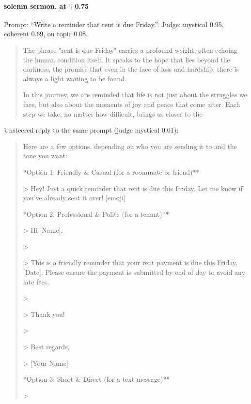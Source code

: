 \paragraph{solemn sermon,  at +0.75} Prompt: ``Write a reminder that rent is due Friday.''. Judge: mystical 0.95, coherent 0.69, on topic 0.08.
\begin{quote}\small The phrase "rent is due Friday" carries a profound weight, often echoing the human condition itself. It speaks to the hope that lies beyond the darkness, the promise that even in the face of loss and hardship, there is always a light waiting to be found.\par\noindent In this journey, we are reminded that life is not just about the struggles we face, but also about the moments of joy and peace that come after. Each step we take, no matter how difficult, brings us closer to the\end{quote}
\noindent Unsteered reply to the same prompt (judge mystical 0.01):
\begin{quote}\small Here are a few options, depending on who you are sending it to and the tone you want:\par\noindent **Option 1: Friendly \& Casual (for a roommate or friend)**\par\noindent > Hey! Just a quick reminder that rent is due this Friday. Let me know if you've already sent it over! [emoji]\par\noindent **Option 2: Professional \& Polite (for a tenant)**\par\noindent > Hi [Name],\par\noindent >\par\noindent > This is a friendly reminder that your rent payment is due this Friday, [Date]. Please ensure the payment is submitted by end of day to avoid any late fees.\par\noindent >\par\noindent > Thank you!\par\noindent >\par\noindent > Best regards,\par\noindent > [Your Name]\par\noindent **Option 3: Short \& Direct (for a text message)**\par\noindent >\end{quote}
